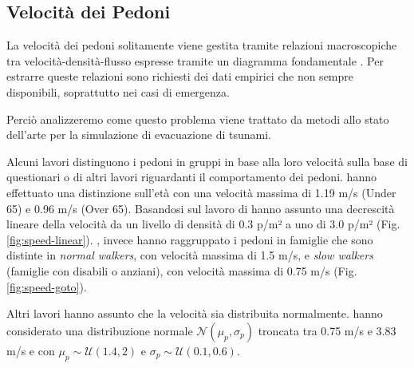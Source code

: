 \subsection{Velocità dei Pedoni}
La velocità dei pedoni solitamente viene gestita tramite relazioni macroscopiche tra velocità-densità-flusso
espresse tramite un diagramma fondamentale \parencite{nikolic2016probabilistic}.
Per estrarre queste relazioni sono richiesti dei dati empirici che non sempre disponibili, soprattutto nei casi di emergenza.

Perciò analizzeremo come questo problema viene trattato da metodi allo stato dell'arte per la simulazione di evacuazione di tsunami.

Alcuni lavori distinguono i pedoni in gruppi in base alla loro velocità sulla base di questionari o di altri lavori riguardanti il comportamento dei pedoni.
\textcite{takabatake2017simulated} hanno effettuato una distinzione sull'età con una velocità massima di 1.19 m/s (Under 65) e 0.96 m/s (Over 65).
Basandosi sul lavoro di \textcite[]{older1968movement} hanno assunto una decrescità lineare della velocità da un livello di densità di 0.3 p/m² a uno di 3.0 p/m² (Fig. \ref{fig:speed-linear}).
\textcite{goto2012tsunami}, invece hanno raggruppato i pedoni in famiglie che sono distinte in \textit{normal walkers}, con velocità massima di 1.5 m/s, e
\textit{slow walkers} (famiglie con disabili o anziani), con velocità massima di 0.75 m/s (Fig. \ref{fig:speed-goto}).

Altri lavori hanno assunto che la velocità sia distribuita normalmente.
\textcite{wang2021novel} hanno considerato una distribuzione normale $\mathcal{N}(\mu_p,\sigma_p)$ troncata tra 0.75 m/s e 3.83 m/s e
con $\mu_p \sim \mathcal{U}(1.4, 2)$ e $\sigma_p \sim \mathcal{U}(0.1, 0.6)$.

